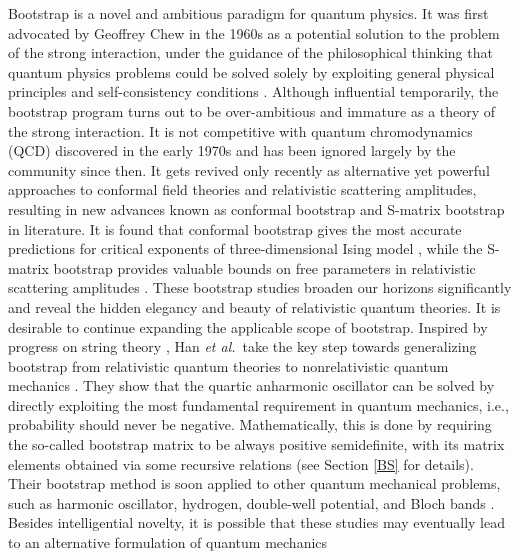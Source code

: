 \documentclass[aps,prc,reprint,superscriptaddress,nofootinbib]{revtex4-2}
\begin{document}
Bootstrap is a novel and ambitious paradigm for quantum physics.
It was first advocated by Geoffrey Chew in the 1960s as a potential solution to the problem of the strong interaction,
under the guidance of the philosophical thinking that quantum physics problems could be solved solely by exploiting general physical principles and self-consistency 
conditions \cite{Chew:1962}.
Although influential temporarily,
the bootstrap program turns out to be over-ambitious and immature as a theory of the strong interaction. It is not competitive with quantum chromodynamics (QCD) discovered in the early 1970s and has been ignored largely by the community since then.
It gets revived only recently as alternative yet powerful approaches to conformal field theories and relativistic scattering amplitudes,
 resulting in new advances known as conformal bootstrap \cite{Poland:2018epd} and S-matrix bootstrap \cite{Paulos:2017fhb} in literature.
It is found that conformal bootstrap gives the most accurate predictions for critical exponents of three-dimensional Ising model \cite{El-Showk:2014dwa},
while the S-matrix bootstrap
provides valuable bounds on free parameters in relativistic scattering amplitudes \cite{Guerrieri:2021tak}. 
These bootstrap studies broaden our horizons significantly and reveal the hidden elegancy and beauty of relativistic quantum theories.
It is desirable to continue expanding the applicable scope of bootstrap.
%
Inspired by progress on string theory \cite{Anderson:2016rcw,Lin:2020mme}, Han \emph{et al.}~take the key step towards generalizing bootstrap from relativistic quantum theories to nonrelativistic quantum mechanics \cite{Han:2020bkb}.
They show that the quartic anharmonic oscillator can be solved by directly exploiting the most fundamental requirement in quantum mechanics, i.e., 
probability should never be negative.
Mathematically, this is done by requiring the so-called bootstrap matrix to be always positive semidefinite,
with its matrix elements obtained via some recursive relations (see Section \ref{BS} for details).
Their bootstrap method is soon applied to other quantum mechanical problems, 
such as harmonic oscillator, hydrogen, double-well potential, and Bloch bands \cite{Berenstein:2021dyf,Bhattacharya:2021btd,Aikawa:2021eai,Tchoumakov:2021mnh,Aikawa:2021qbl,Berenstein:2021loy,Du:2021hfw}.
Besides intelligential novelty, 
it is possible that these studies may eventually lead to an alternative formulation of quantum mechanics
\end{document}
